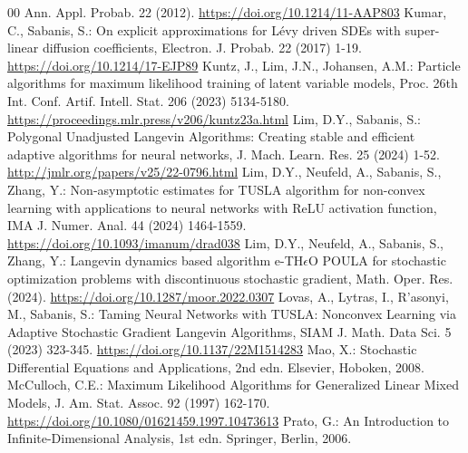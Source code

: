 \documentclass[a4paper, 10pt]{article}
\theoremstyle{plain}%
\begin{document}
\begin{thebibliography}{00}
    Ann. Appl. Probab.
    22 (2012).
    \url{https://doi.org/10.1214/11-AAP803}
    Kumar, C., Sabanis, S.:
    On explicit approximations for Lévy driven SDEs with super-linear diffusion coefficients,
    Electron. J. Probab.
    22 (2017) 1-19.
    \url{https://doi.org/10.1214/17-EJP89}
    Kuntz, J., Lim, J.N., Johansen, A.M.:
    Particle algorithms for maximum likelihood training of latent variable models,
    Proc. 26th Int. Conf. Artif. Intell. Stat.
    206 (2023) 5134-5180.
    \url{https://proceedings.mlr.press/v206/kuntz23a.html}
    Lim, D.Y., Sabanis, S.:
    Polygonal Unadjusted Langevin Algorithms: Creating stable and efficient adaptive algorithms for neural networks,
    J. Mach. Learn. Res.
    25  (2024) 1-52.
    \url{http://jmlr.org/papers/v25/22-0796.html}
    Lim, D.Y., Neufeld, A., Sabanis, S., Zhang, Y.:
    Non-asymptotic estimates for TUSLA algorithm for non-convex learning with applications to neural networks with ReLU activation function,
    IMA J. Numer. Anal.
    44 (2024) 1464-1559.
    \url{https://doi.org/10.1093/imanum/drad038}
    Lim, D.Y., Neufeld, A., Sabanis, S., Zhang, Y.:
    Langevin dynamics based algorithm e-TH$\epsilon$O POULA for stochastic optimization problems with discontinuous stochastic gradient,
    Math. Oper. Res.
    (2024).
    \url{https://doi.org/10.1287/moor.2022.0307}
    Lovas, A., Lytras, I., R'{a}sonyi, M., Sabanis, S.:
    Taming Neural Networks with TUSLA: Nonconvex Learning via Adaptive Stochastic Gradient Langevin Algorithms,
    SIAM J. Math. Data Sci.
    5 (2023) 323-345.
    \url{https://doi.org/10.1137/22M1514283}
    Mao, X.:
    Stochastic Differential Equations and Applications,
    2nd edn.
    Elsevier, Hoboken,
    2008.
     McCulloch, C.E.:
    Maximum Likelihood Algorithms for Generalized Linear Mixed Models,
    J. Am. Stat. Assoc.
    92 (1997) 162-170.
    \url{https://doi.org/10.1080/01621459.1997.10473613}
    Prato, G.:
    An Introduction to Infinite-Dimensional Analysis,
    1st edn.
    Springer, Berlin,
    2006.

\end{thebibliography}
\end{document}
